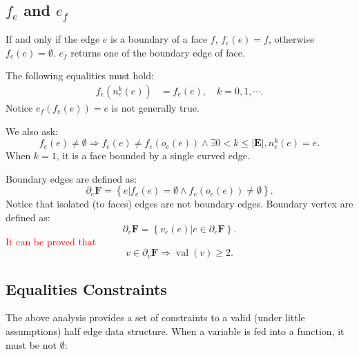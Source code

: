 \documentclass[9pt,twocolumn]{extarticle}
\newcommand{\TODO}[1]{\textcolor{red}{#1}}
\newcommand{\SET}[1]{\mathbf{#1}}
\DeclareMathOperator{\VAL}{val}
\begin{document}


\subsection{$f_e$ and $e_f$}
If and only if the edge $e$ is a boundary of a face $f$, $f_e(e)=f$,
otherwise $f_e(e)=\emptyset$.  $e_f$ returns one of the boundary edge
of face.

The following equalities must hold:
\begin{equation}
  \begin{split}
    f_e(n_e^k(e)) &= f_e(e), \quad k=0, 1, \cdots.
    \label{eq:fe}
  \end{split}
\end{equation}
Notice $e_f(f_e(e)) = e$ is not generally true.

We also ask:
\begin{equation}
  f_e(e) \neq \emptyset \Rightarrow f_e(e) \neq f_e(o_e(e)) \wedge
  \exists 0 < k \leq |\SET{E}|, n_e^k(e) = e.
\end{equation}
When $k=1$, it is a face bounded by a single curved edge.

Boundary edges are defined as:
\begin{equation}
  \partial_e \SET{F} = \left\{e|f_e(e)=\emptyset \wedge f_e(o_e(e)) \neq
  \emptyset\right\}.
\end{equation}
Notice that isolated (to faces) edges are not boundary edges.
Boundary vertex are defined as:
\begin{equation}
  \partial_v \SET{F} = \left\{v_e(e)|e\in \partial_e \SET{F}\right\}.
\end{equation}
\TODO{It can be proved that}
\begin{equation}
  v \in \partial_v \SET{F} \Rightarrow \VAL(v) \geq 2.
\end{equation}

\subsection{Equalities Constraints}
The above analysis provides a set of constraints to a valid (under
little assumptions) half edge data structure.  When a variable is fed
into a function, it must be not $\emptyset$:
\end{document}
